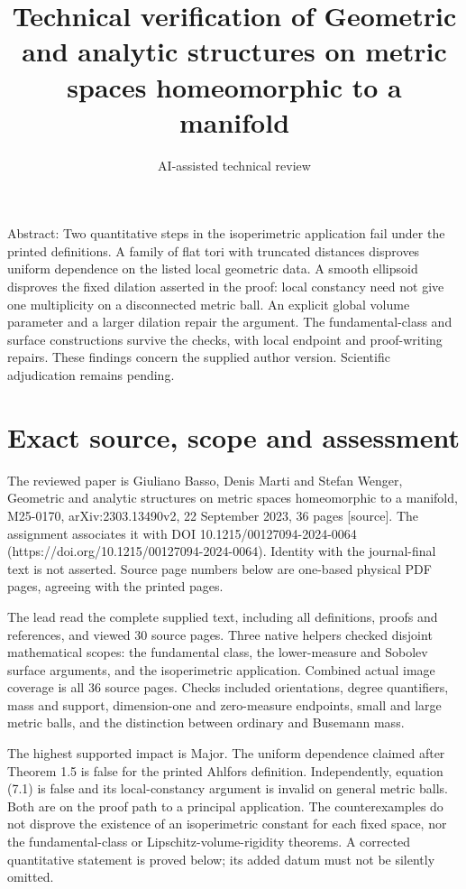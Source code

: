 \documentclass[10pt]{article}
\title{Technical verification of Geometric and analytic structures on metric spaces homeomorphic to a manifold}
\author{AI-assisted technical review}
\date{}
\begin{document}
\maketitle
Abstract: Two quantitative steps in the isoperimetric application fail under the printed definitions. A family of flat tori with truncated distances disproves uniform dependence on the listed local geometric data. A smooth ellipsoid disproves the fixed dilation asserted in the proof: local constancy need not give one multiplicity on a disconnected metric ball. An explicit global volume parameter and a larger dilation repair the argument. The fundamental-class and surface constructions survive the checks, with local endpoint and proof-writing repairs. These findings concern the supplied author version. Scientific adjudication remains pending.\par
\section*{Exact source, scope and assessment}
The reviewed paper is Giuliano Basso, Denis Marti and Stefan Wenger, Geometric and analytic structures on metric spaces homeomorphic to a manifold, M25-0170, arXiv:2303.13490v2, 22 September 2023, 36 pages [source]. The assignment associates it with DOI 10.1215/00127094-2024-0064 (https://doi.org/10.1215/00127094-2024-0064). Identity with the journal-final text is not asserted. Source page numbers below are one-based physical PDF pages, agreeing with the printed pages.\par
The lead read the complete supplied text, including all definitions, proofs and references, and viewed 30 source pages. Three native helpers checked disjoint mathematical scopes: the fundamental class, the lower-measure and Sobolev surface arguments, and the isoperimetric application. Combined actual image coverage is all 36 source pages. Checks included orientations, degree quantifiers, mass and support, dimension-one and zero-measure endpoints, small and large metric balls, and the distinction between ordinary and Busemann mass.\par
The highest supported impact is Major. The uniform dependence claimed after Theorem 1.5 is false for the printed Ahlfors definition. Independently, equation (7.1) is false and its local-constancy argument is invalid on general metric balls. Both are on the proof path to a principal application. The counterexamples do not disprove the existence of an isoperimetric constant for each fixed space, nor the fundamental-class or Lipschitz-volume-rigidity theorems. A corrected quantitative statement is proved below; its added datum must not be silently omitted.\par
\end{document}
